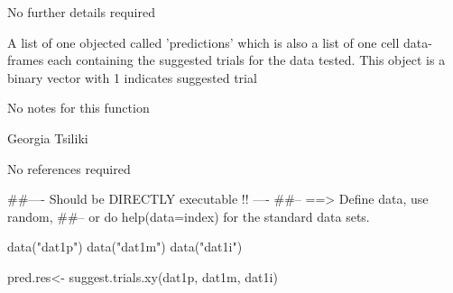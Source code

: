 \documentclass[letterpaper]{book}
\begin{document}
%
\begin{Details}\relax
 No further details required 
\end{Details}
%
\begin{Value}
A list of one objected called 'predictions' which is also a list of one cell data-frames each containing the suggested trials for the data tested. This object is a binary vector with 1 indicates suggested trial
\end{Value}
%
\begin{Note}\relax
 No notes for this function 
\end{Note}
%
\begin{Author}\relax
Georgia Tsiliki
\end{Author}
%
\begin{References}\relax
 No references required 
\end{References}
%
\begin{Examples}
\begin{ExampleCode}
##---- Should be DIRECTLY executable !! ----
##-- ==>  Define data, use random,
##--  or do  help(data=index)  for the standard data sets.

data("dat1p")
data("dat1m")
data("dat1i")

pred.res<- suggest.trials.xy(dat1p, dat1m, dat1i) 

\end{ExampleCode}
\end{Examples}
\printindex{}
\end{document}
